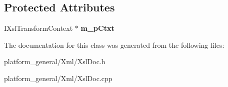 \subsection*{\-Protected \-Attributes}
\begin{DoxyCompactItemize}
\item 
\hypertarget{classgeneral__server_1_1XslDoc_a0f2c63d40b77c3e8c0f6bb94b3f8696a}{\-I\-Xsl\-Transform\-Context $\ast$ {\bfseries m\-\_\-p\-Ctxt}}\label{classgeneral__server_1_1XslDoc_a0f2c63d40b77c3e8c0f6bb94b3f8696a}

\end{DoxyCompactItemize}


\-The documentation for this class was generated from the following files\-:\begin{DoxyCompactItemize}
\item 
platform\-\_\-general/\-Xml/\-Xsl\-Doc.\-h\item 
platform\-\_\-general/\-Xml/\-Xsl\-Doc.\-cpp\end{DoxyCompactItemize}
